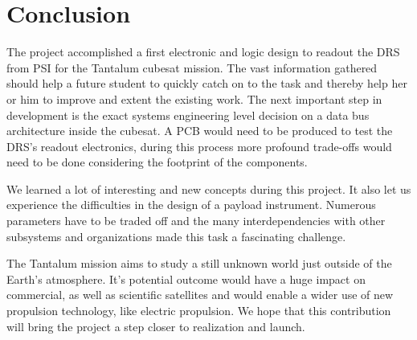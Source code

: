 \section{Conclusion}
\label{sec:conclusion}
The project accomplished a first electronic and logic design to readout the DRS from PSI for the Tantalum cubesat mission.
The vast information gathered should help a future student to quickly catch on to the task and thereby help her or him to improve and extent the existing work.
The next important step in development is the exact systems engineering level decision on a data bus architecture inside the cubesat.
A PCB would need to be produced to test the DRS's readout electronics, during this process more profound trade-offs would need to be done considering the footprint of the components.

We learned a lot of interesting and new concepts during this project.
It also let us experience the difficulties in the design of a payload instrument.
Numerous parameters have to be traded off and the many interdependencies with other subsystems and organizations made this task a fascinating challenge.

The Tantalum mission aims to study a still unknown world just outside of the Earth's atmosphere.
It's potential outcome would have a huge impact on commercial, as well as scientific satellites and would enable a wider use of new propulsion technology, like electric propulsion.
We hope that this contribution will bring the project a step closer to realization and launch.


